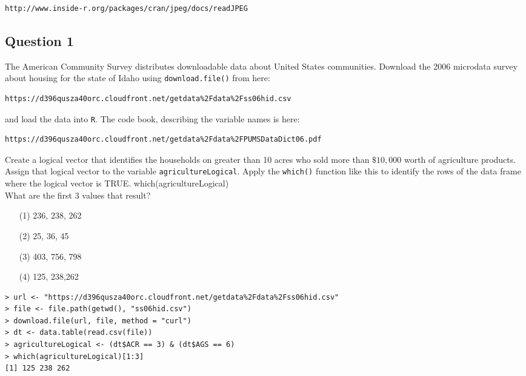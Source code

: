 \documentclass[]{article}
\begin{document}
\begin{verbatim}
http://www.inside-r.org/packages/cran/jpeg/docs/readJPEG
\end{verbatim}
\subsection*{Question 1}
The American Community Survey distributes downloadable data about United States communities. Download the 2006 microdata survey about housing for the state of Idaho using \texttt{download.file()} from here: 
\begin{verbatim}
https://d396qusza40orc.cloudfront.net/getdata%2Fdata%2Fss06hid.csv 
\end{verbatim}
and load the data into \texttt{R}. The code book, describing the variable names is here: 
\begin{verbatim}
https://d396qusza40orc.cloudfront.net/getdata%2Fdata%2FPUMSDataDict06.pdf 
\end{verbatim}

\noindent Create a logical vector that identifies the households on greater than 10 acres who sold more than $\$10,000$ worth of agriculture products. 
\\
Assign that logical vector to the variable \texttt{agricultureLogical}. Apply the \texttt{which()} function like this to identify the rows of the data frame where the logical vector is TRUE. which(agricultureLogical) 
\\
What are the first 3 values that result?
\begin{itemize}
\item[(1)] 236, 238, 262
\item[(2)] 25, 36, 45
\item[(3)] 403, 756, 798
\item[(4)] 125, 238,262
\end{itemize}
\begin{framed}
\begin{verbatim}
> url <- "https://d396qusza40orc.cloudfront.net/getdata%2Fdata%2Fss06hid.csv"
> file <- file.path(getwd(), "ss06hid.csv")
> download.file(url, file, method = "curl")
> dt <- data.table(read.csv(file))
> agricultureLogical <- (dt$ACR == 3) & (dt$AGS == 6)
> which(agricultureLogical)[1:3]
[1] 125 238 262
\end{verbatim}
\end{framed}
\newpage
\end{document}
